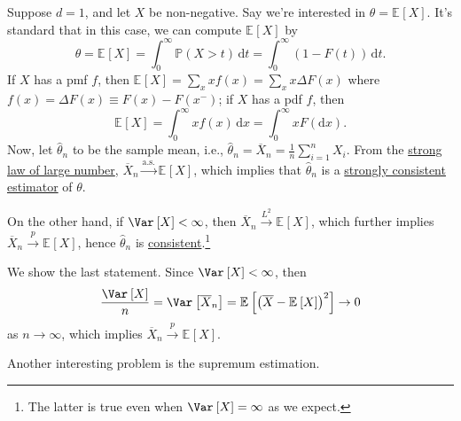 \begin{eg}
	Suppose \(d = 1\), and let \(X\) be non-negative. Say we're interested in \(\theta = \mathbb{E}_{}\left[X \right] \). It's standard that in this case, we can compute \(\mathbb{E}_{}\left[X \right] \) by
	\[
		\theta
		= \mathbb{E}_{}\left[X \right]
		= \int_{0}^{\infty} \mathbb{P} (X > t) \,\mathrm{d}t
		= \int_{0}^{\infty} (1 - F(t)) \,\mathrm{d}t.
	\]
	If \(X\) has a pmf \(f\), then \(\mathbb{E}_{}\left[X \right] = \sum_{x} x f(x) = \sum_{x} x \Delta F(x)\) where \(f(x) = \Delta F(x) \equiv F(x) - F(x^-)\); if \(X\) has a pdf \(f\), then
	\[
		\mathbb{E}_{}\left[X \right]
		= \int_{0}^{\infty} x f(x) \,\mathrm{d}x
		= \int_{0}^{\infty} x F(\mathrm{d}x).
	\]
	Now, let \(\hat{\theta} _n\) to be the sample mean, i.e., \(\hat{\theta} _n = \overline{X} _n = \frac{1}{n} \sum_{i=1}^{n} X_i\). From the \hyperref[thm:SLLN]{strong law of large number}, \(\overline{X} _n \overset{\text{a.s.} }{\to } \mathbb{E}_{}\left[ X \right] \), which implies that \(\hat{\theta} _n\) is a \hyperref[def:strongly-consistent]{strongly consistent estimator} of \(\theta \).

	On the other hand, if \(\Var_{}\left[X \right] < \infty \), then \(\overline{X} _n \overset{L^2}{\to } \mathbb{E}_{}\left[X \right] \), which further implies \(\overline{X} _n \overset{p}{\to } \mathbb{E}_{}\left[X \right] \), hence \(\hat{\theta} _n\) is \hyperref[def:consistent]{consistent}.\footnote{The latter is true even when \(\Var_{}\left[X \right] = \infty \) as we expect.}
\end{eg}
\begin{explanation}
	We show the last statement. Since \(\Var_{}\left[X \right] < \infty \), then
	\[
		\frac{\Var_{}\left[X \right] }{n}
		= \Var_{}\left[\overline{X} _n \right]
		= \mathbb{E}_{}\left[ \left( \overline{X} - \mathbb{E}_{}\left[X \right]  \right) ^2 \right]
		\to 0
	\]
	as \(n \to \infty \), which implies \(\overline{X} _n \overset{p}{\to } \mathbb{E}_{}\left[X \right] \).
\end{explanation}

Another interesting problem is the supremum estimation.

